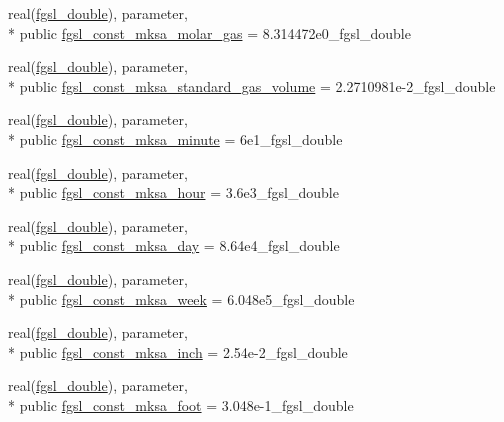 \begin{DoxyCompactItemize}
\item 
real(\hyperlink{classfgsl_a9af5113378e0f000eb479d3f90196ddf}{fgsl\-\_\-double}), parameter, \\*
public \hyperlink{classfgsl_aba418557adafd1575eab5108ba172cf7}{fgsl\-\_\-const\-\_\-mksa\-\_\-molar\-\_\-gas} = 8.\-314472e0\-\_\-fgsl\-\_\-double
\item 
real(\hyperlink{classfgsl_a9af5113378e0f000eb479d3f90196ddf}{fgsl\-\_\-double}), parameter, \\*
public \hyperlink{classfgsl_a43547e219346197d5b5b8c6adff614eb}{fgsl\-\_\-const\-\_\-mksa\-\_\-standard\-\_\-gas\-\_\-volume} = 2.\-2710981e-\/2\-\_\-fgsl\-\_\-double
\item 
real(\hyperlink{classfgsl_a9af5113378e0f000eb479d3f90196ddf}{fgsl\-\_\-double}), parameter, \\*
public \hyperlink{classfgsl_a5c0cc4ab0dc2be570d83ef0f9d2f4ba6}{fgsl\-\_\-const\-\_\-mksa\-\_\-minute} = 6e1\-\_\-fgsl\-\_\-double
\item 
real(\hyperlink{classfgsl_a9af5113378e0f000eb479d3f90196ddf}{fgsl\-\_\-double}), parameter, \\*
public \hyperlink{classfgsl_aa7d132341cda0d591f1452a894cf5855}{fgsl\-\_\-const\-\_\-mksa\-\_\-hour} = 3.\-6e3\-\_\-fgsl\-\_\-double
\item 
real(\hyperlink{classfgsl_a9af5113378e0f000eb479d3f90196ddf}{fgsl\-\_\-double}), parameter, \\*
public \hyperlink{classfgsl_af69acf253e04452510d9ec67efa458d2}{fgsl\-\_\-const\-\_\-mksa\-\_\-day} = 8.\-64e4\-\_\-fgsl\-\_\-double
\item 
real(\hyperlink{classfgsl_a9af5113378e0f000eb479d3f90196ddf}{fgsl\-\_\-double}), parameter, \\*
public \hyperlink{classfgsl_aecb67f391facbac682484e9d352dac5e}{fgsl\-\_\-const\-\_\-mksa\-\_\-week} = 6.\-048e5\-\_\-fgsl\-\_\-double
\item 
real(\hyperlink{classfgsl_a9af5113378e0f000eb479d3f90196ddf}{fgsl\-\_\-double}), parameter, \\*
public \hyperlink{classfgsl_a272689a26b0b7b5cd89f28713aa251d4}{fgsl\-\_\-const\-\_\-mksa\-\_\-inch} = 2.\-54e-\/2\-\_\-fgsl\-\_\-double
\item 
real(\hyperlink{classfgsl_a9af5113378e0f000eb479d3f90196ddf}{fgsl\-\_\-double}), parameter, \\*
public \hyperlink{classfgsl_acff74ed42941dc6324409ba0eee894ee}{fgsl\-\_\-const\-\_\-mksa\-\_\-foot} = 3.\-048e-\/1\-\_\-fgsl\-\_\-double
\item 

\end{DoxyCompactItemize}
